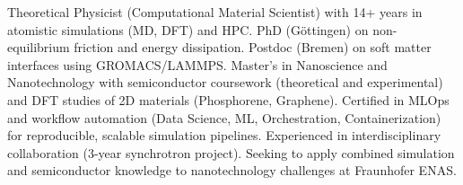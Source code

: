 \vspace{-1em}\fontsize{8.7}{11.6}\selectfont\lighttext\color{black!95} Theoretical Physicist (Computational Material Scientist) with 14+ years in atomistic simulations (MD, DFT) and HPC. PhD (Göttingen) on non-equilibrium friction and energy dissipation. Postdoc (Bremen) on soft matter interfaces using GROMACS/LAMMPS. Master's in Nanoscience and Nanotechnology with semiconductor coursework (theoretical and experimental) and DFT studies of 2D materials (Phosphorene, Graphene). Certified in MLOps and workflow automation (Data Science, ML, Orchestration, Containerization) for reproducible, scalable simulation pipelines. Experienced in interdisciplinary collaboration (3-year synchrotron project). Seeking to apply combined simulation and semiconductor knowledge to nanotechnology challenges at Fraunhofer ENAS.\\
